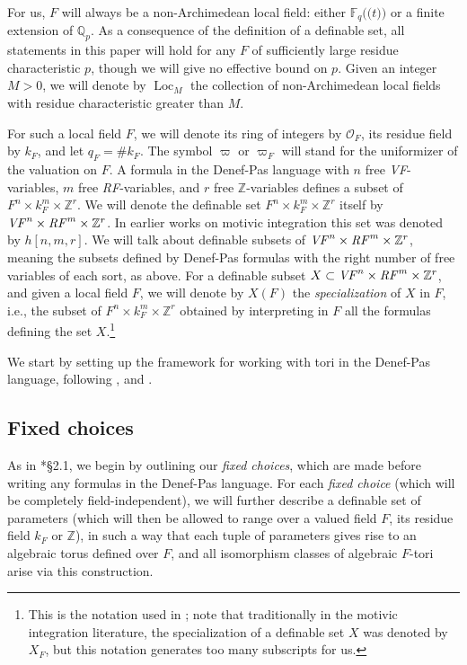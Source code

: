 \documentclass{amsart}
\newcommand{\Q}{{\mathbb Q}}
\newcommand{\F}{{\mathbb F}}
\newcommand{\Z}{{\mathbb Z}}
\newcommand{\ri}{\mathcal{O}}
\DeclareMathOperator{\loc}{Loc}
\def\llp{\mathopen{(\!(}}
\def\rrp{\mathopen{)\!)}}
\theoremstyle{plain}
\theoremstyle{definition}
\begin{document}
For us, $F$ will always be a non-Archimedean local field: either $\F_q\llp t\rrp$ or a finite extension of $\Q_p$.
As a consequence of the definition of a definable set, all statements in this paper will hold for any $F$ of sufficiently large residue characteristic $p$, 
though we will give no effective bound on $p$. 
Given an integer $M>0$, we will denote by $\loc_M$ the collection of non-Archimedean local fields
with residue characteristic greater than $M$. 

For such a local field $F$, we will denote its ring of integers by $\ri_F$, its residue field by $k_F$,
and let $q_F=\# k_F$. The symbol $\varpi$ or $\varpi_F$ will stand for the uniformizer of the valuation on $F$. 
A formula in the Denef-Pas language  with $n$ free \emph{VF}-variables, $m$ free \emph{RF}-variables, and $r$ free 
$\Z$-variables 
defines a subset of $F^n\times k_F^m \times \Z^r$. 
We will denote the definable set $F^n\times k_F^m \times \Z^r$ itself by
$\mbox{\emph{VF}}^n\times \mbox{\emph{RF}}^m\times \Z^r$.
In earlier works on motivic integration this set was denoted by $h[n,m,r]$. 
We will talk about definable subsets of $\mbox{\emph{VF}}^n\times \mbox{\emph{RF}}^m\times \Z^r$,
meaning the subsets defined by Denef-Pas formulas with the right number of free variables of each sort, as above. 
For a definable subset $X\subset \mbox{\emph{VF}}^n\times \mbox{\emph{RF}}^m\times \Z^r$, and given a local field $F$,  
we will denote by $X(F)$ the \emph{specialization} of $X$ in $F$, i.e., the subset of
$F^n\times k_F^m\times \Z^r$ obtained by interpreting in $F$ all the formulas defining the set $X$.\footnote{This
is the notation used in \cite{gordon-hales:15a}; note that traditionally in the motivic integration literature,
the {specialization} of a definable set $X$ was denoted by $X_F$, but this notation generates too many subscripts for us.} 

We start by setting up the framework for working with tori in the Denef-Pas language,
following \cite{cluckers-hales-loeser}, \cite{cluckers-gordon-halupczok:14b} and \cite{gordon-hales:15a}.



\subsection{Fixed choices}\label{sub:fixedchoices}

As in \cite{gordon-hales:15a}*{\S 2.1}, we begin by outlining our \emph{fixed choices},
which are made before writing any formulas in the Denef-Pas language.  
For each \emph{fixed choice} (which will be completely field-independent), we will further describe
a definable set of parameters (which will then be allowed to range over a valued field $F$,
its residue field $k_F$ or $\Z$), in such a way that each tuple of parameters gives rise to an algebraic torus
defined over $F$, and all isomorphism classes of algebraic $F$-tori arise via this construction.
\end{document}
